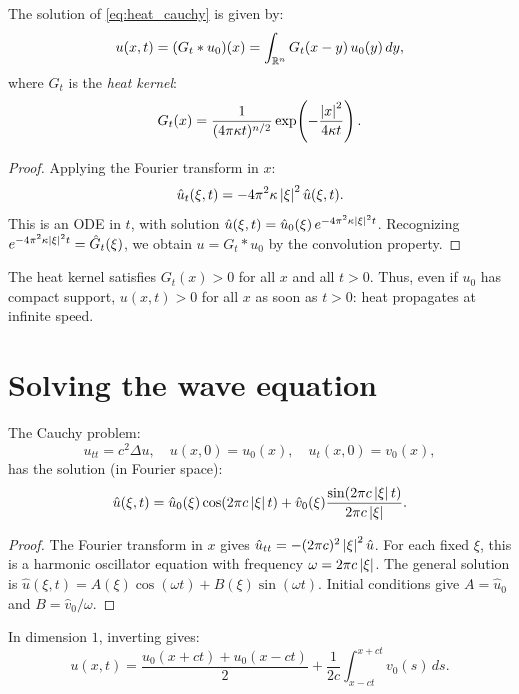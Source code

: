 \begin{theorem}
\label{thm:heat_fourier}
The solution of \eqref{eq:heat_cauchy} is given by:
\[
    u(x, t) = (G_t * u_0)(x) = \int_{\mathbb{R}^n} G_t(x - y)\, u_0(y)\, dy,
\]
where $G_t$ is the \emph{heat kernel}:
\[
    G_t(x) = \frac{1}{(4\pi \kappa t)^{n/2}} \exp\!\left(-\frac{\left| x \right|^2}{4\kappa t}\right).
\]
\end{theorem}

\begin{proof}
Applying the Fourier transform in $x$:
\[
    \hat{u}_t(\xi, t) = -4\pi^2 \kappa \left| \xi \right|^2 \hat{u}(\xi, t).
\]
This is an ODE in $t$, with solution
$\hat{u}(\xi, t) = \hat{u}_0(\xi)\, e^{-4\pi^2 \kappa \left| \xi \right|^2 t}$.
Recognizing $e^{-4\pi^2 \kappa \left| \xi \right|^2 t} = \hat{G}_t(\xi)$, we obtain
$u = G_t * u_0$ by the convolution property.
\end{proof}

\begin{warning}[title=\textbf{Instantaneous propagation}]
The heat kernel satisfies $G_t(x) > 0$ for all $x$ and all $t > 0$. Thus, even
if $u_0$ has compact support, $u(x, t) > 0$ for all $x$ as soon as $t > 0$:
heat propagates at infinite speed.
\end{warning}

\section{Solving the wave equation}

\begin{theorem}
The Cauchy problem:
\[
    u_{tt} = c^2 \Delta u, \quad u(x,0) = u_0(x), \quad u_t(x,0) = v_0(x),
\]
has the solution (in Fourier space):
\[
    \hat{u}(\xi, t) = \hat{u}_0(\xi) \cos(2\pi c \left| \xi \right| t)
    + \hat{v}_0(\xi) \frac{\sin(2\pi c \left| \xi \right| t)}{2\pi c \left| \xi \right|}.
\]
\end{theorem}

\begin{proof}
The Fourier transform in $x$ gives
$\hat{u}_{tt} = -(2\pi c)^2 \left| \xi \right|^2 \hat{u}$. For each fixed $\xi$, this
is a harmonic oscillator equation with frequency $\omega = 2\pi c \left| \xi \right|$.
The general solution is $\hat{u}(\xi, t) = A(\xi)\cos(\omega t) + B(\xi)\sin(\omega t)$.
Initial conditions give $A = \hat{u}_0$ and $B = \hat{v}_0 / \omega$.
\end{proof}

\begin{example}[d'Alembert's formula ($n = 1$)]
In dimension $1$, inverting gives:
\[
    u(x,t) = \frac{u_0(x+ct) + u_0(x-ct)}{2} + \frac{1}{2c}\int_{x-ct}^{x+ct} v_0(s)\, ds.
\]
\end{example}

